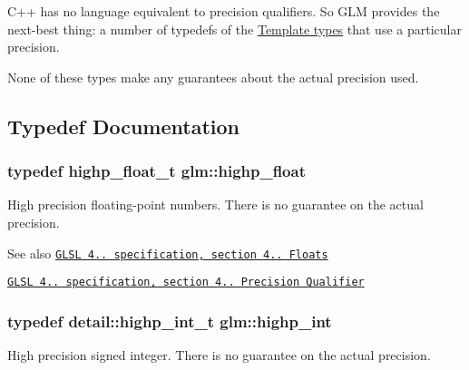 \-C++ has no language equivalent to precision qualifiers. \-So \-G\-L\-M provides the next-\/best thing\-: a number of typedefs of the \hyperlink{group__core__template}{\-Template types} that use a particular precision.

\-None of these types make any guarantees about the actual precision used. 

\subsection{\-Typedef \-Documentation}
\hypertarget{group__core__precision_ga3d443a093adc053638ed7f81c5bfe300}{
\subsubsection[{highp\-\_\-float}]{\setlength{\rightskip}{0pt plus 5cm}typedef highp\-\_\-float\-\_\-t {\bf glm\-::highp\-\_\-float}}}\label{group__core__precision_ga3d443a093adc053638ed7f81c5bfe300}
\-High precision floating-\/point numbers. \-There is no guarantee on the actual precision.

\begin{DoxySeeAlso}{\-See also}
\href{http://www.opengl.org/registry/doc/GLSLangSpec.4.20.8.pdf}{\tt \-G\-L\-S\-L 4.. specification, section 4.. \-Floats} 

\href{http://www.opengl.org/registry/doc/GLSLangSpec.4.20.8.pdf}{\tt \-G\-L\-S\-L 4.. specification, section 4.. \-Precision \-Qualifier} 
\end{DoxySeeAlso}
\hypertarget{group__core__precision_gaafed5240eb0a43328cb75faf5fb0a8c2}{
\subsubsection[{highp\-\_\-int}]{\setlength{\rightskip}{0pt plus 5cm}typedef detail\-::highp\-\_\-int\-\_\-t {\bf glm\-::highp\-\_\-int}}}\label{group__core__precision_gaafed5240eb0a43328cb75faf5fb0a8c2}
\-High precision signed integer. \-There is no guarantee on the actual precision.

